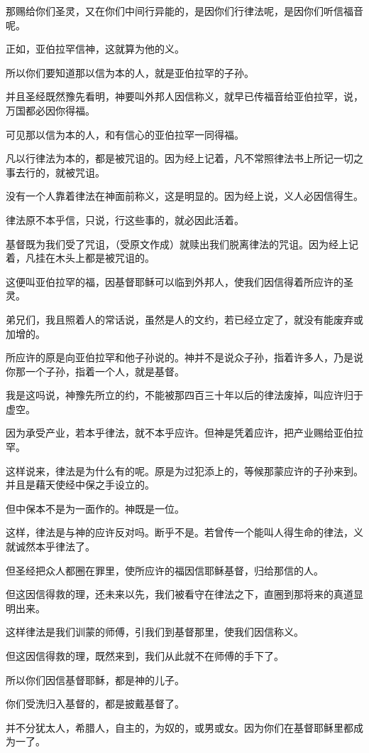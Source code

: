 \documentclass[12pt,oneside]{book}
\begin{document}
那赐给你们圣灵，又在你们中间行异能的，是因你们行律法呢，是因你们听信福音呢。

正如，亚伯拉罕信神，这就算为他的义。

所以你们要知道那以信为本的人，就是亚伯拉罕的子孙。

并且圣经既然豫先看明，神要叫外邦人因信称义，就早已传福音给亚伯拉罕，说，万国都必因你得福。

可见那以信为本的人，和有信心的亚伯拉罕一同得福。

凡以行律法为本的，都是被咒诅的。因为经上记着，凡不常照律法书上所记一切之事去行的，就被咒诅。

没有一个人靠着律法在神面前称义，这是明显的。因为经上说，义人必因信得生。

律法原不本乎信，只说，行这些事的，就必因此活着。

基督既为我们受了咒诅，（受原文作成）就赎出我们脱离律法的咒诅。因为经上记着，凡挂在木头上都是被咒诅的。

这便叫亚伯拉罕的福，因基督耶稣可以临到外邦人，使我们因信得着所应许的圣灵。

弟兄们，我且照着人的常话说，虽然是人的文约，若已经立定了，就没有能废弃或加增的。

所应许的原是向亚伯拉罕和他子孙说的。神并不是说众子孙，指着许多人，乃是说你那一个子孙，指着一个人，就是基督。

我是这吗说，神豫先所立的约，不能被那四百三十年以后的律法废掉，叫应许归于虚空。

因为承受产业，若本乎律法，就不本乎应许。但神是凭着应许，把产业赐给亚伯拉罕。

这样说来，律法是为什么有的呢。原是为过犯添上的，等候那蒙应许的子孙来到。并且是藉天使经中保之手设立的。

但中保本不是为一面作的。神既是一位。

这样，律法是与神的应许反对吗。断乎不是。若曾传一个能叫人得生命的律法，义就诚然本乎律法了。

但圣经把众人都圈在罪里，使所应许的福因信耶稣基督，归给那信的人。

但这因信得救的理，还未来以先，我们被看守在律法之下，直圈到那将来的真道显明出来。

这样律法是我们训蒙的师傅，引我们到基督那里，使我们因信称义。

但这因信得救的理，既然来到，我们从此就不在师傅的手下了。

所以你们因信基督耶稣，都是神的儿子。

你们受洗归入基督的，都是披戴基督了。

并不分犹太人，希腊人，自主的，为奴的，或男或女。因为你们在基督耶稣里都成为一了。
\end{document}
